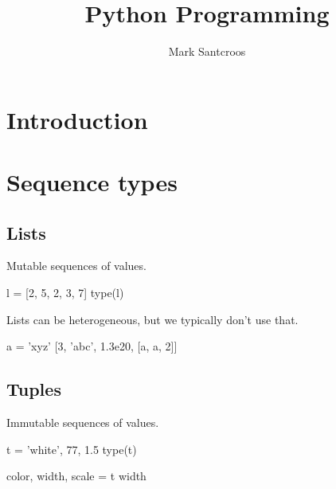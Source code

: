 \documentclass[aspectratio=1610,slidestop]{beamer}
\author{Mark Santcroos}
\title{Python Programming}
\begin{document}


\section{Introduction}



\section{Sequence types}

\subsection{Lists}
\begin{pframe}
Mutable sequences of values.
\begin{pyconsole}
l = [2, 5, 2, 3, 7]
type(l)
\end{pyconsole}
\medskip
\medskip
Lists can be heterogeneous, but we typically don't use that.
\begin{pyconsole}
a = 'xyz'
[3, 'abc', 1.3e20, [a, a, 2]]
\end{pyconsole}
\end{pframe}


\subsection{Tuples}
\begin{pframe}
Immutable sequences of values.
\begin{pyconsole}
t = 'white', 77, 1.5
type(t)

color, width, scale = t
width
\end{pyconsole}
\end{pframe}
\end{document}
